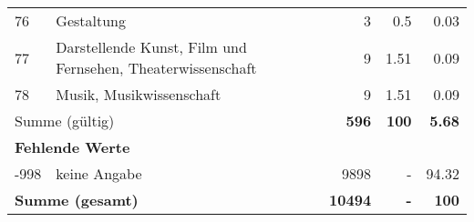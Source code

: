 \begin{longtable}{lXrrr}
        76 & \multicolumn{1}{X}{Gestaltung} & %
          \num{3} &
          \num[round-mode=places,round-precision=2]{0,5} &
          \num[round-mode=places,round-precision=2]{0,03} \\

        77 & \multicolumn{1}{X}{Darstellende Kunst, Film und Fernsehen, Theaterwissenschaft} & %
          \num{9} &
          \num[round-mode=places,round-precision=2]{1,51} &
          \num[round-mode=places,round-precision=2]{0,09} \\

        78 & \multicolumn{1}{X}{Musik, Musikwissenschaft} & %
          \num{9} &
          \num[round-mode=places,round-precision=2]{1,51} &
          \num[round-mode=places,round-precision=2]{0,09} \\

     \midrule
     \multicolumn{2}{l}{Summe (gültig)} &
       \textbf{\num{596}} &
     \textbf{100} &
       \textbf{\num[round-mode=places,round-precision=2]{5,68}} \\
     \multicolumn{5}{l}{\textbf{Fehlende Werte}}\\
       -998 &
       keine Angabe &
         \num{9898} &
        - &
         \num[round-mode=places,round-precision=2]{94,32} \\
     \midrule
     \multicolumn{2}{l}{\textbf{Summe (gesamt)}} &
          \textbf{\num{10494}} &
        \textbf{-} &
        \textbf{100} \\
     \bottomrule
     \end{longtable}
     
